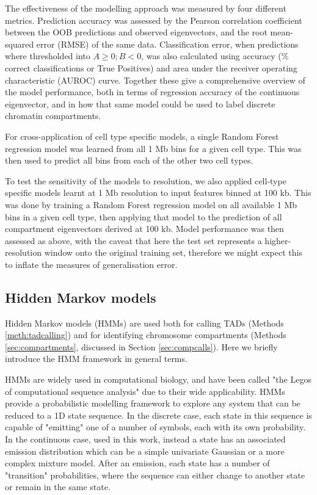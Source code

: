 \documentclass[a4paper,11pt,oneside]{book}
\begin{document}
The effectiveness of the modelling approach was measured by four
different metrics. Prediction accuracy was assessed by the Pearson
correlation coefficient between the OOB predictions and observed eigenvectors, and the root mean-squared
error (RMSE) of the same data. Classification error, when predictions
where thresholded into $A \geq 0; B < 0$, was also calculated using
accuracy (\% correct classifications or True Positives) and area under
the receiver operating characteristic (AUROC) curve. Together these give
a comprehensive overview of the model performance, both in terms of
regression accuracy of the continuous eigenvector, and in how that same
model could be used to label discrete chromatin compartments.

For cross-application of cell type specific models, a single Random
Forest regression model was learned from all 1 Mb bins for a given cell
type. This was then used to predict all bins from each of the other two
cell types.

To test the sensitivity of the models to resolution, we also applied cell-type specific models learnt at 1 Mb resolution to input features binned at 100 kb. This was done by training a Random Forest regression model on all available 1 Mb bins in a given cell type, then applying that model to the prediction of all compartment eigenvectors derived at 100 kb. Model performance was then assessed as above, with the caveat that here the test set represents a higher-resolution window onto the original training set, therefore we might expect this to inflate the measures of generalisation error.

\subsection{Hidden Markov models}\label{meth:hmm}

Hidden Markov models (HMMs) are used both for calling TADs (Methods \ref{meth:tadcalling}) and for identifying chromosome compartments (Methods \ref{sec:compartments}, discussed in Section \ref{sec:compcalls}). Here we briefly introduce the HMM framework in general terms.

HMMs are widely used in computational biology, and have been called "the Legos of computational sequence analysis"\cite{Eddy2004} due to their wide applicability. HMMs provide a probabilistic modelling framework to explore any system that can be reduced to a 1D state sequence.\cite{Eddy1996, Rabiner1989} In the discrete case, each state in this sequence is capable of "emitting" one of a number of symbols, each with its own probability. In the continuous case, used in this work, instead a state has an associated emission distribution which can be a simple univariate Gaussian or a more complex mixture model. After an emission, each state has a number of "transition" probabilities, where the sequence can either change to another state or remain in the same state.
\end{document}
